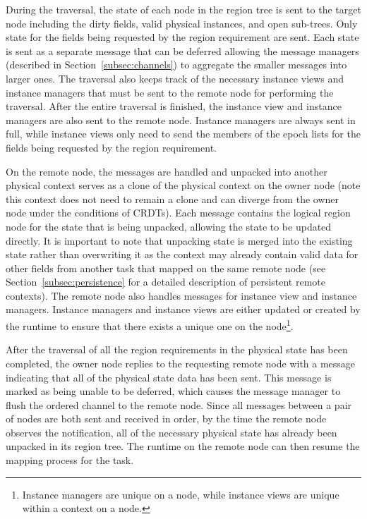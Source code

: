 During the traversal, the state of each node in 
the region tree is sent to the target node including 
the dirty fields, valid physical instances, and open
sub-trees. Only state for the fields being requested
by the region requirement are sent. Each state is
sent as a separate message that can be deferred
allowing the message managers (described in 
Section~\ref{subsec:channels}) to aggregate the
smaller messages into larger ones. The traversal
also keeps track of the necessary instance views
and instance managers that must be sent to the 
remote node for performing the traversal. After
the entire traversal is finished, the instance
view and instance managers are also sent to the
remote node.  Instance managers are always
sent in full, while instance views only need to
send the members of the epoch lists for the
fields being requested by the region requirement.

On the remote node, the messages are handled and 
unpacked into another physical context serves as a
clone of the physical context on the owner
node (note this context does not need to remain
a clone and can diverge from the owner node under
the conditions of CRDTs). Each message contains the 
logical region node for the state that is being unpacked,
allowing the state to be updated directly. It is
important to note that unpacking state is merged
into the existing state rather than overwriting
it as the context may already contain valid
data for other fields from another task that
mapped on the same remote node (see 
Section~\ref{subsec:persistence} for a detailed
description of persistent remote contexts). 
The remote node also handles messages for 
instance view and instance managers. Instance
managers and instance views are either updated
or created by the runtime to ensure that 
there exists a unique one on the node\footnote{
Instance managers are unique on a node, 
while instance views are unique within a 
context on a node.}.

After the traversal of all the region requirements
in the physical state has been completed, the owner 
node replies to the requesting remote node with a 
message indicating that all of the physical state
data has been sent.  This message is marked as being 
unable to be deferred, which causes the message 
manager to flush the ordered channel to the remote 
node. Since all messages between a pair of nodes 
are both sent and received in order, by the time 
the remote node observes the notification, all of
the necessary physical state has already been unpacked
in its region tree.  The runtime on the remote node
can then resume the mapping process for the task.

